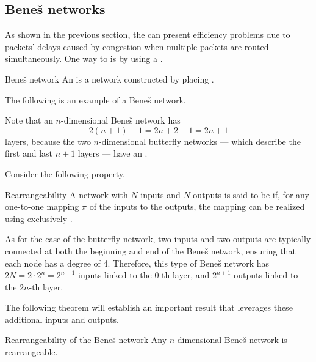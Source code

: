 \documentclass[a4paper, 12pt]{report}
\begin{document}
    \subsection{Beneš networks}

    As shown in the previous section, the  can present efficiency problems due to packets' delays caused by congestion when multiple packets are routed simultaneously. One way to  is by using a .

    \begin{frameddefn}{Beneš network}
        An  is a network constructed by placing .
    \end{frameddefn}

    \begin{example}
        The following is an example of a Beneš network.

    \end{example}

    Note that an $n$-dimensional Beneš network has $$2(n + 1) - 1 = 2n + 2 - 1 = 2n + 1$$ layers, because the two $n$-dimensional butterfly networks --- which describe the first and last $n + 1$ layers --- have an .

    Consider the following property.

    \begin{frameddefn}{Rearrangeability}
        A network with $N$ inputs and $N$ outputs is said to be  if, for any one-to-one mapping $\pi$ of the inputs to the outputs, the mapping can be realized using exclusively .
    \end{frameddefn}
    
    As for the case of the butterfly network, two inputs and two outputs are typically connected at both the beginning and end of the Beneš network, ensuring that each node has a degree of 4. Therefore, this type of Beneš network has $2N = 2 \cdot 2^n = 2^{n + 1}$ inputs linked to the $0$-th layer, and $2^{n + 1}$ outputs linked to the $2n$-th layer.

    The following theorem will establish an important result that leverages these additional inputs and outputs.

    \begin{framedthm}{Rearrangeability of the Beneš network}
        Any $n$-dimensional Beneš network is rearrangeable.
    \end{framedthm}
\end{document}
